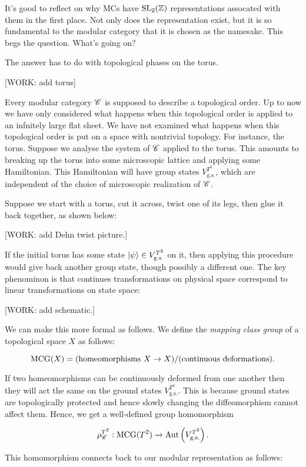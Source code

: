 It's good to reflect on why MCs have $\operatorname{SL}_2(\mathbb{Z})$ representations assocated with them in the first place. Not only does the representation exist, but it is so fundamental to the modular category that it is chosen as the namesake. This begs the question. What's going on?

The answer has to do with topological phases on the torus.

[WORK: add torus]

Every modular category $\mathscr{C}$ is supposed to describe a topological order. Up to now we have only considered what happens when this topological order is applied to an infnitely large flat sheet. We have not examined what happens when this topological order is put on a space with nontrivial topology. For instance, the torus. Suppose we analyse the system of $\mathscr{C}$ applied to the torus. This amounts to breaking up the torus into some microscopic lattice and applying some Hamiltonian. This Hamiltonian will have group states $V_{\text{g.s.}}^{T^2}$, which are independent of the choice of microscopic realization of $\mathscr{C}$.

Suppose we start with a torus, cut it across, twist one of its legs, then glue it back together, as shown below:

[WORK: add Dehn twist picture.]

If the initial torus has some state $\ket{\psi}\in V_{\text{g.s.}}^{T^2}$ on it, then applying this procedure would give back another group state, though possibly a different one. The key phenominon is that continues transformations on physical space correspond to linear transformations on state space:

[WORK: add schematic.]

We can make this more formal as follows. We define the \textit{mapping class group} of a topological space $X$ as follows:

$$\operatorname{MCG}(X)=(\text{homeomorphisms $X\to X$})/(\text{continuous deformations}).$$

If two homeomorphisms can be continuously deformed from one another then they will act the same on the ground states $V_{\text{g.s.}}^{T^2}$. This is because ground states are topologically protected and hence slowly changing the diffeomorphism cannot affect them. Hence, we get a well-defined group homomorphism

$$\rho_{\mathscr{C}}^{T^2}:\operatorname{MCG}(T^2)\xrightarrow{}\operatorname{Aut}\left(V_{\text{g.s.}}^{T^2}\right).$$

This homomorphism connects back to our modular representation as follows:

